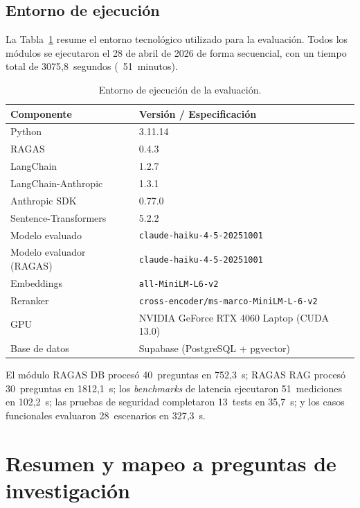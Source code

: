 \subsection{Entorno de ejecución}
\label{subsec:entorno}

La Tabla~\ref{tab:entorno} resume el entorno tecnológico utilizado para la evaluación. Todos los módulos se ejecutaron el 28 de abril de 2026 de forma secuencial, con un tiempo total de 3075,8~segundos (~51~minutos).

\begin{table}[H]
\centering
\caption{Entorno de ejecución de la evaluación.}
\label{tab:entorno}
\footnotesize
\begin{tabularx}{\columnwidth}{lX}
\toprule
\textbf{Componente} & \textbf{Versión / Especificación} \\
\midrule
Python                  & 3.11.14 \\
\ac{RAGAS}                   & 0.4.3 \\
LangChain               & 1.2.7 \\
LangChain-Anthropic     & 1.3.1 \\
Anthropic SDK           & 0.77.0 \\
Sentence-Transformers   & 5.2.2 \\
Modelo evaluado         & \texttt{claude-haiku-4-5-20251001} \\
Modelo evaluador (\ac{RAGAS})& \texttt{claude-haiku-4-5-20251001} \\
Embeddings              & \texttt{all-MiniLM-L6-v2} \\
Reranker                & \texttt{cross-encoder/ms-marco-MiniLM-L-6-v2} \\
GPU                     & NVIDIA GeForce RTX 4060 Laptop (CUDA 13.0) \\
Base de datos           & Supabase (PostgreSQL + pgvector) \\
\bottomrule
\end{tabularx}
\end{table}

El módulo \ac{RAGAS} DB procesó 40~preguntas en 752,3~s; \ac{RAGAS} \ac{RAG} procesó 30~preguntas en 1812,1~s; los \textit{benchmarks} de latencia ejecutaron 51~mediciones en 102,2~s; las pruebas de seguridad completaron 13~tests en 35,7~s; y los casos funcionales evaluaron 28~escenarios en 327,3~s.

\section{Resumen y mapeo a preguntas de investigación}
\label{sec:resumen}

